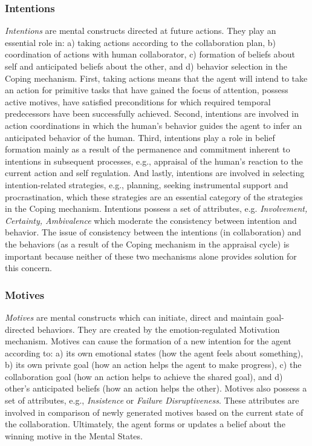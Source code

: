 \subsubsection{Intentions}

\textit{Intentions} are mental constructs directed at future actions. They play
an essential role in: a) taking actions according to the collaboration plan, b)
coordination of actions with human collaborator, c) formation of beliefs about
self and anticipated beliefs about the other, and d) behavior selection in the
Coping mechanism. First, taking actions means that the agent will intend to take
an action for primitive tasks that have gained the focus of attention, possess
active motives, have satisfied preconditions for which required temporal
predecessors have been successfully achieved. Second, intentions are involved
in action coordinations in which the human's behavior guides the agent to infer
an anticipated behavior of the human. Third, intentions play a role in belief
formation mainly as a result of the permanence and commitment inherent to
intentions in subsequent processes, e.g., appraisal of the human's reaction to
the current action and self regulation. And lastly, intentions are involved in
selecting intention-related strategies, e.g., planning, seeking instrumental
support and procrastination, which these strategies are an essential category of
the strategies in the Coping mechanism. Intentions possess a set of attributes,
e.g. \textit{Involvement, Certainty, Ambivalence} which moderate the consistency
between intention and behavior. The issue of consistency between the intentions
(in collaboration) and the behaviors (as a result of the Coping mechanism in the
appraisal cycle) is important because neither of these two mechanisms alone
provides solution for this concern.

\subsubsection{Motives}

\textit{Motives} are mental constructs which can initiate, direct and maintain
goal-directed behaviors. They are created by the emotion-regulated Motivation
mechanism. Motives can cause the formation of a new intention for the agent
according to: a) its own emotional states (how the agent feels about something),
b) its own private goal (how an action helps the agent to make progress), c) the
collaboration goal (how an action helps to achieve the shared goal), and d)
other's anticipated beliefs (how an action helps the other). Motives also
possess a set of attributes, e.g., \textit{Insistence} or \textit{Failure
Disruptiveness}. These attributes are involved in comparison of newly generated
motives based on the current state of the collaboration. Ultimately, the agent
forms or updates a belief about the winning motive in the Mental States.

